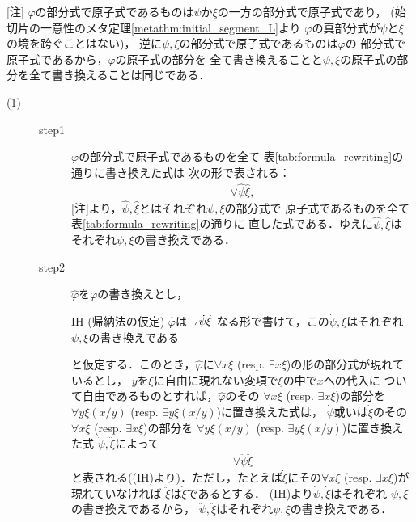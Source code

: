 	\begin{metaprf}\mbox{}
		[注] $\varphi$の部分式で原子式であるものは$\psi$か$\xi$の一方の部分式で原子式であり，
		(始切片の一意性のメタ定理\ref{metathm:initial_segment_L}より
		$\varphi$の真部分式が$\psi$と$\xi$の境を跨ぐことはない)，
		逆に$\psi,\xi$の部分式で原子式であるものは$\varphi$の
		部分式で原子式であるから，$\varphi$の原子式の部分を
		全て書き換えることと$\psi,\xi$の原子式の部分を全て書き換えることは同じである．
		\begin{description}
			\item[(1)] 
				\begin{description}
					\item[step1]
						$\varphi$の部分式で原子式であるものを全て
						表\ref{tab:formula_rewriting}の通りに書き換えた式は
						次の形で表される：
						\begin{align}
							\vee \hat{\psi} \hat{\xi},
						\end{align}
						[注]より，$\hat{\psi},\hat{\xi}$とはそれぞれ$\psi,\xi$の部分式で
						原子式であるものを全て表\ref{tab:formula_rewriting}の通りに
						直した式である．ゆえに$\hat{\psi},\hat{\xi}$は
						それぞれ$\psi,\xi$の書き換えである．
						
					\item[step2]
						$\widehat{\varphi}$を$\varphi$の書き換えとし，
						\begin{itembox}[l]{IH (帰納法の仮定)}
							$\widehat{\varphi}$は$\rightharpoondown\hspace{-0.25em} \dot{\psi} \dot{\xi}$
							なる形で書けて，この$\dot{\psi},\dot{\xi}$はそれぞれ
							$\psi,\xi$の書き換えである
						\end{itembox}
						と仮定する．このとき，$\widehat{\varphi}$に$\forall x \xi$ 
						(resp. $\exists x \xi$)の形の部分式が現れているとし，
						$y$を$\xi$に自由に現れない変項で$\xi$の中で$x$への代入に
						ついて自由であるものとすれば，$\widehat{\varphi}$のその
						$\forall x \xi$ (resp. $\exists x \xi$)の部分を
						$\forall y \xi(x/y)$
						(resp. $\exists y \xi(x/y)$)に置き換えた式は，
						$\dot{\psi}$或いは$\dot{\xi}$のその$\forall x \xi$
						(resp. $\exists x \xi$)の部分を
						$\forall y \xi(x/y)$
						(resp. $\exists y \xi(x/y)$)に置き換えた式
						$\ddot{\psi},\ddot{\xi}$によって
						\begin{align}
							\vee \ddot{\psi} \ddot{\xi}
						\end{align}
						と表される((IH)より)．ただし，たとえば$\dot{\xi}$にその$\forall x \xi$
						(resp. $\exists x \xi$)が現れていなければ
						$\ddot{\xi}$は$\dot{\xi}$であるとする．
						(IH)より$\dot{\psi},\dot{\xi}$はそれぞれ
						$\psi,\xi$の書き換えであるから，
						$\ddot{\psi},\ddot{\xi}$はそれぞれ$\psi,\xi$の書き換えである．
				\end{description}
				

\end{description}
\end{metaprf}
